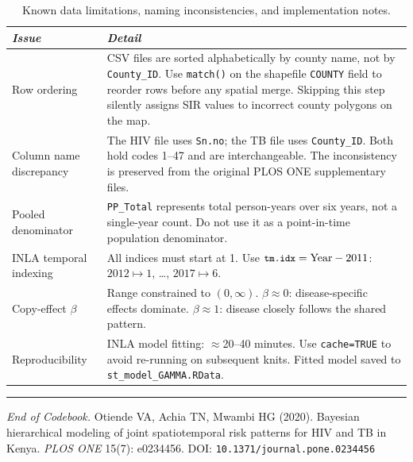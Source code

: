 \documentclass[11pt,a4paper]{article}
\newcommand{\code}[1]{\texttt{\small #1}}
\begin{document}
\begin{table}[H]
\caption{Known data limitations, naming inconsistencies, and implementation notes.}
\renewcommand{\arraystretch}{1.10}
\scriptsize\begin{tabularx}{\textwidth}{@{}L{4.0cm}X@{}}
\toprule
\textit{Issue} & \textit{Detail}\\
\midrule
Row ordering
  & CSV files are sorted alphabetically by county name, not by \code{County\_ID}. Use \code{match()} on the shapefile \code{COUNTY} field to reorder rows before any spatial merge. Skipping this step silently assigns SIR values to incorrect county polygons on the map.\\
Column name discrepancy
  & The HIV file uses \code{Sn.no}; the TB file uses \code{County\_ID}. Both hold codes 1--47 and are interchangeable. The inconsistency is preserved from the original PLOS ONE supplementary files.\\
Pooled denominator
  & \code{PP\_Total} represents total person-years over six years, not a single-year count. Do not use it as a point-in-time population denominator.\\
INLA temporal indexing
  & All indices must start at 1. Use $\code{tm.idx}=\text{Year}-2011$: $2012\mapsto1$, \ldots, $2017\mapsto6$.\\
Copy-effect $\beta$
  & Range constrained to $(0,\infty)$. $\beta\approx0$: disease-specific effects dominate. $\beta\approx1$: disease closely follows the shared pattern.\\
Reproducibility
  & INLA model fitting: $\approx$20--40 minutes. Use \code{cache=TRUE} to avoid re-running on subsequent knits. Fitted model saved to \code{st\_model\_GAMMA.RData}.\\
\bottomrule
\end{tabularx}
\renewcommand{\arraystretch}{1.10}
\end{table}

\vspace{12pt}\hrule\vspace{6pt}

\noindent\small\textit{End of Codebook.}\enspace
Otiende VA, Achia TN, Mwambi HG (2020).
Bayesian hierarchical modeling of joint spatiotemporal risk patterns for HIV
and TB in Kenya. \textit{PLOS ONE} 15(7): e0234456.
DOI: \texttt{10.1371/journal.pone.0234456}
\end{document}
